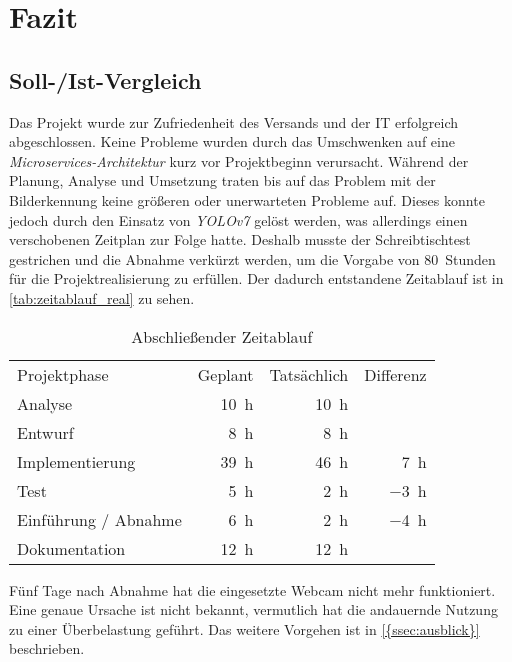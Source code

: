 \section{Fazit}

\subsection{Soll-/Ist-Vergleich}

Das Projekt wurde zur Zufriedenheit des Versands und der IT erfolgreich abgeschlossen. Keine Probleme wurden durch das Umschwenken auf eine \textit{\gls{Microservices-Architektur}} kurz vor Projektbeginn verursacht. Während der Planung, Analyse und Umsetzung traten bis auf das Problem mit der Bilderkennung keine größeren oder unerwarteten Probleme auf. Dieses konnte jedoch durch den Einsatz von \textit{\gls{YOLOv7}} gelöst werden, was allerdings einen verschobenen Zeitplan zur Folge hatte. Deshalb musste der Schreibtischtest gestrichen und die Abnahme verkürzt werden, um die Vorgabe von \SI{80}{Stunden} für die Projektrealisierung zu erfüllen. Der dadurch entstandene Zeitablauf ist in \vref{tab:zeitablauf_real} zu sehen.

\begin{table}[htbp]
  \centering
  \renewcommand{\arraystretch}{1.25}
  \caption{Abschließender Zeitablauf}
  \begin{tabular}{lrrr}
    Projektphase         & Geplant        & Tatsächlich    & Differenz      \\
    Analyse              & \SI{10}{\hour} & \SI{10}{\hour} &                \\
    Entwurf              & \SI{8}{\hour}  & \SI{8}{\hour}  &                \\
    Implementierung      & \SI{39}{\hour} & \SI{46}{\hour} & \SI{+7}{\hour} \\
    Test                 & \SI{5}{\hour}  & \SI{2}{\hour}  & \SI{-3}{\hour} \\
    Einführung / Abnahme & \SI{6}{\hour}  & \SI{2}{\hour}  & \SI{-4}{\hour} \\
    Dokumentation        & \SI{12}{\hour} & \SI{12}{\hour}                  \\
  \end{tabular}
  \label{tab:zeitablauf_real}
\end{table}

Fünf Tage nach Abnahme hat die eingesetzte Webcam nicht mehr funktioniert. Eine genaue Ursache ist nicht bekannt, vermutlich hat die andauernde Nutzung zu einer Überbelastung geführt. Das weitere Vorgehen ist in \vref{{ssec:ausblick}} beschrieben.


